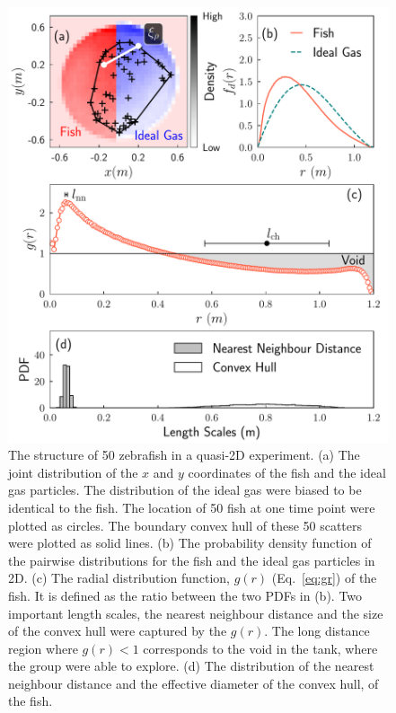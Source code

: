 \documentclass[11pt,twoside]{report}
\begin{document}
 \begin{figure}
  \includegraphics[width=\linewidth]{structure-2d-50}
  \caption[The structure of 50 zebrafish in 2D]{
  The structure of 50 zebrafish in a quasi-2D experiment.
  	(a) The joint distribution of the $x$ and $y$ coordinates of the fish and the ideal gas particles. The distribution of the ideal gas were biased to be identical to the fish. The location of 50 fish at one time point were plotted as circles. The boundary convex hull of these 50 scatters were plotted as solid lines.
  	(b) The probability density function of the pairwise distributions for the fish and the ideal gas particles in 2D.
  	(c) The radial distribution function, $g(r)$ (Eq.~\ref{eq:gr}) of the fish. It is defined as the ratio between the two PDFs in (b). Two important length scales, the nearest neighbour distance and the size of the convex hull were captured by the $g(r)$. The long distance region where $g(r) < 1$ corresponds to the void in the tank, where the group were able to explore.
  	(d) The distribution of the nearest neighbour distance and the effective diameter of the convex hull, of the fish.
  }
  \label{fig:structure-2d}
\end{figure}
\end{document}
